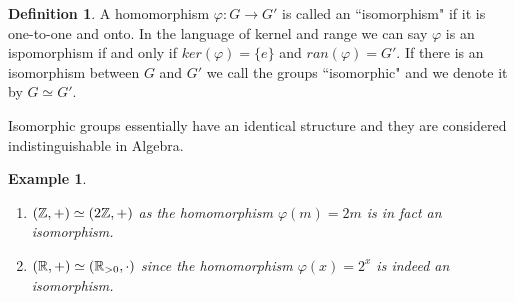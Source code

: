 \documentclass[12pt]{article}
\theoremstyle{plain}
\newtheorem{example}{Example}
\theoremstyle{definition}
\newtheorem{definition}{Definition}
\theoremstyle{remark}
\begin{document}
 \begin{definition}
 A homomorphism $\varphi:G\rightarrow G'$ is called an ``isomorphism" if it is one-to-one and onto. In the language of kernel and range we can say $\varphi$ is an ispomorphism if and only if $ker(\varphi)=\{e\}$ and $ran(\varphi)=G'$. 
 If there is an isomorphism between $G$ and $G'$ we call the groups ``isomorphic" and we denote it by $G\simeq G'$.
 \end{definition}
 Isomorphic groups essentially have an identical structure and they are considered indistinguishable in Algebra. 
 
 \begin{example}
\begin{enumerate}
    \item $(\mathbb{Z}, +) \simeq (2\mathbb{Z}, +)$ as the homomorphism $\varphi(m)=2m$ is in fact an isomorphism. 
     \item $(\mathbb{R}, +) \simeq (\mathbb{R}_{>0},\cdot)$ since the homomorphism $\varphi(x) = 2^x$ is indeed an isomorphism. 
\end{enumerate}
 \end{example}
\end{document}
